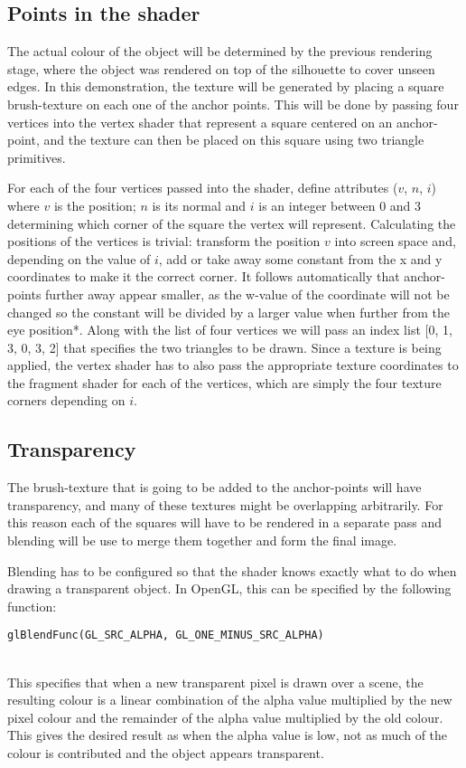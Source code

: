 \documentclass[a4paper, 12pt]{article}
\begin{document}
\subsection{Points in the shader}
The actual colour of the object will be determined by the previous rendering stage, where the object was rendered on top of the silhouette to cover unseen edges. In this demonstration, the texture will be generated by placing a square brush-texture on each one of the anchor points. This will be done by passing four vertices into the vertex shader that represent a square centered on an anchor-point, and the texture can then be placed on this square using two triangle primitives.

For each of the four vertices passed into the shader, define attributes ($v$, $n$, $i$) where $v$ is the position; $n$ is its normal and $i$ is an integer between 0 and 3 determining which corner of the square the vertex will represent. Calculating the positions of the vertices is trivial: transform the position $v$ into screen space and, depending on the value of $i$, add or take away some constant from the x and y coordinates to make it the correct corner. It follows automatically that anchor-points further away appear smaller, as the w-value of the coordinate will not be changed so the constant will be divided by a larger value when further from the eye position*. Along with the list of four vertices we will pass an index list [0, 1, 3, 0, 3, 2] that specifies the two triangles to be drawn. Since a texture is being applied, the vertex shader has to also pass the appropriate texture coordinates to the fragment shader for each of the vertices, which are simply the four texture corners depending on $i$.


\subsection{Transparency}
The brush-texture that is going to be added to the anchor-points will have transparency, and many of these textures might be overlapping arbitrarily. For this reason each of the squares will have to be rendered in a separate pass and blending will be use to merge them together and form the final image.

Blending has to be configured so that the shader knows exactly what to do when drawing a transparent object. In OpenGL, this can be specified by the following function:\\
\centerline{\texttt{glBlendFunc(GL\_SRC\_ALPHA, GL\_ONE\_MINUS\_SRC\_ALPHA)\;}}\\
This specifies that when a new transparent pixel is drawn over a scene, the resulting colour is a linear combination of the alpha value multiplied by the new pixel colour and the remainder of the alpha value multiplied by the old colour. This gives the desired result as when the alpha value is low, not as much of the colour is contributed and the object appears transparent.
\end{document}
